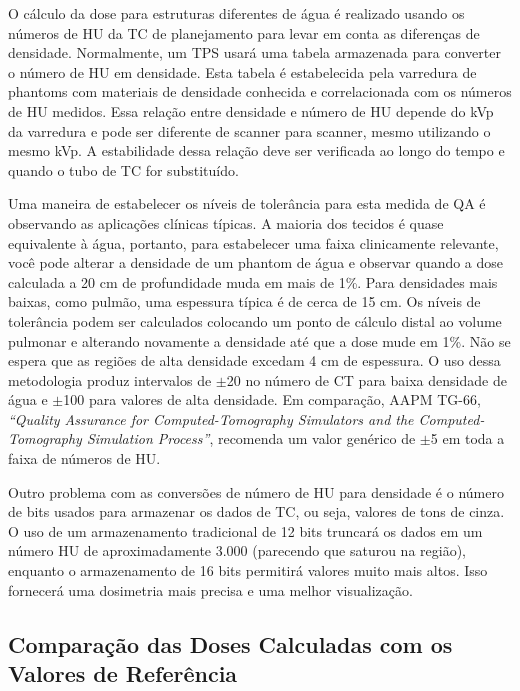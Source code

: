\documentclass[11pt,a4paper]{article}
\begin{document}
	O cálculo da dose para estruturas diferentes de água é realizado usando os números de HU da TC de planejamento para levar em conta as diferenças de densidade. Normalmente, um TPS usará uma tabela armazenada para converter o número de HU em densidade. Esta tabela é estabelecida pela varredura de phantoms com materiais de densidade conhecida e correlacionada com os números de HU medidos. Essa relação entre densidade e número de HU depende do kVp da varredura e pode ser diferente de scanner para scanner, mesmo utilizando o mesmo kVp. A estabilidade dessa relação deve ser verificada ao longo do tempo e quando o tubo de TC for substituído.

	Uma maneira de estabelecer os níveis de tolerância para esta medida de QA é observando as aplicações clínicas típicas. A maioria dos tecidos é quase equivalente à água, portanto, para estabelecer uma faixa clinicamente relevante, você pode alterar a densidade de um phantom de água e observar quando a dose calculada a 20 cm de profundidade muda em mais de 1\%. Para densidades mais baixas, como pulmão, uma espessura típica é de cerca de 15 cm. Os níveis de tolerância podem ser calculados colocando um ponto de cálculo distal ao volume pulmonar e alterando novamente a densidade até que a dose mude em 1\%. Não se espera que as regiões de alta densidade excedam 4 cm de espessura. O uso dessa metodologia produz intervalos de $\pm$20 no número de CT para baixa densidade de água e $\pm$100 para valores de alta densidade. Em comparação, AAPM TG-66, \textit{``Quality Assurance for Computed-Tomography Simulators and the Computed-Tomography Simulation Process''}, recomenda um valor genérico de $\pm$5 em toda a faixa de números de HU.

	Outro problema com as conversões de número de HU para densidade é o número de bits usados para armazenar os dados de TC, ou seja, valores de tons de cinza. O uso de um armazenamento tradicional de 12 bits truncará os dados em um número HU de aproximadamente 3.000 (parecendo que saturou na região), enquanto o armazenamento de 16 bits permitirá valores muito mais altos. Isso fornecerá uma dosimetria mais precisa e uma melhor visualização.

\subsection{Comparação das Doses Calculadas com os Valores de Referência}
\end{document}
